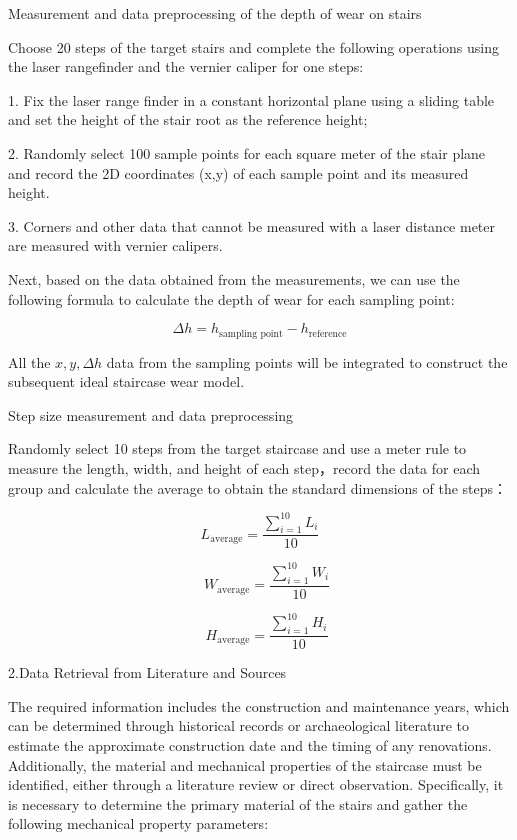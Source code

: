 \documentclass{mcmthesis}
\begin{document}

Measurement and data preprocessing of the depth of wear on stairs

Choose 20 steps of the target stairs and complete the following operations using the laser rangefinder and the vernier caliper for one steps:

1. Fix the laser range finder in a constant horizontal plane using a sliding table and set the height of the stair root as the reference height;

2. Randomly select 100 sample points for each square meter of the stair plane and record the 2D coordinates (x,y) of each sample point and its measured height.

3. Corners and other data that cannot be measured with a laser distance meter are measured with vernier calipers.

Next, based on the data obtained from the measurements, we can use the following formula to calculate the depth of wear for each sampling point:

\[ \Delta h = h_{\text{sampling point}} - h_{\text{reference}} \]

All the \(x, y, \Delta h\) data from the sampling points will be integrated to construct the subsequent ideal staircase wear model.

Step size measurement and data preprocessing

Randomly select 10 steps from the target staircase and use a meter rule to measure the length, width, and height of each step，record the data for each group and calculate the average to obtain the standard dimensions of the steps：

\[L_{\text{average}} = \frac{\sum_{i=1}^{10} L_i}{10}\]

\[\quad W_{\text{average}} = \frac{\sum_{i=1}^{10} W_i}{10}\]

\[\quad H_{\text{average}} = \frac{\sum_{i=1}^{10} H_i}{10}​\]

2.Data Retrieval from Literature and Sources

The required information includes the construction and maintenance years, which can be determined through historical records or archaeological literature to estimate the approximate construction date and the timing of any renovations. Additionally, the material and mechanical properties of the staircase must be identified, either through a literature review or direct observation. Specifically, it is necessary to determine the primary material of the stairs and gather the following mechanical property parameters:
\end{document}
